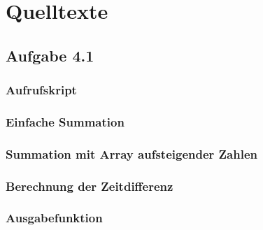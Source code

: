 \documentclass[a4paper,
12pt,
BCOR12mm,
]{scrartcl}
\begin{document}
\section{Quelltexte}
\subsection{Aufgabe 4.1}
\subsubsection{Aufrufskript}
\label{src:call}


\subsubsection{Einfache Summation}
\label{src:sum}

\subsubsection{Summation mit Array aufsteigender Zahlen}
\label{src:ascend}


\subsubsection{Berechnung der Zeitdifferenz}
\label{src:messure}



\subsubsection{Ausgabefunktion}
\label{src:basic}


\end{document}

